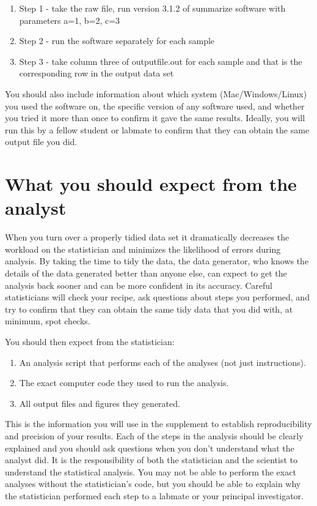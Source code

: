 \documentclass[12pt]{article}
\providecommand{\tightlist}{%
  \setlength{\itemsep}{0pt}\setlength{\parskip}{0pt}}
\begin{document}
\begin{enumerate}
\def\labelenumi{\arabic{enumi}.}
\tightlist
\item
  Step 1 - take the raw file, run version 3.1.2 of summarize software
  with parameters a=1, b=2, c=3
\item
  Step 2 - run the software separately for each sample
\item
  Step 3 - take column three of outputfile.out for each sample and that
  is the corresponding row in the output data set
\end{enumerate}

You should also include information about which system
(Mac/Windows/Linux) you used the software on, the specific version of
any software used, and whether you tried it more than once to confirm it
gave the same results. Ideally, you will run this by a fellow student or
labmate to confirm that they can obtain the same output file you did.

\section{What you should expect from the analyst}
\label{sec:expect}

When you turn over a properly tidied data set it dramatically decreases
the workload on the statistician and minimizes the likelihood of errors
during analysis. By taking the time to tidy the data, the data
generator, who knows the details of the data generated better than
anyone else, can expect to get the analysis back sooner and can be more
confident in its accuracy. Careful statisticians will check your recipe,
ask questions about steps you performed, and try to confirm that they
can obtain the same tidy data that you did with, at minimum, spot
checks.

You should then expect from the statistician:

\begin{enumerate}
\def\labelenumi{\arabic{enumi}.}
\tightlist
\item
  An analysis script that performs each of the analyses (not just
  instructions).
\item
  The exact computer code they used to run the analysis.
\item
  All output files and figures they generated.
\end{enumerate}

This is the information you will use in the supplement to establish
reproducibility and precision of your results. Each of the steps in the
analysis should be clearly explained and you should ask questions when
you don't understand what the analyst did. It is the responsibility of
both the statistician and the scientist to understand the statistical
analysis. You may not be able to perform the exact analyses without the
statistician's code, but you should be able to explain why the
statistician performed each step to a labmate or your principal
investigator.
\end{document}
